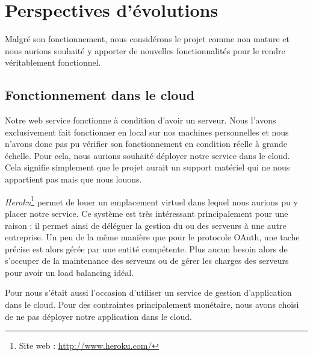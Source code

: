 \section{Perspectives d'évolutions}

Malgré son fonctionnement, nous considérons le projet comme non mature et nous aurions souhaité y apporter de
nouvelles fonctionnalités pour le rendre véritablement fonctionnel.




\subsection{Fonctionnement dans le cloud}

Notre web service fonctionne à condition d'avoir un serveur. Nous l'avons exclusivement fait fonctionner en local
sur nos machines personnelles et nous n'avons donc pas pu vérifier son fonctionnement en condition réelle à grande
échelle. Pour cela, nous aurions souhaité déployer notre service dans le cloud. Cela signifie simplement que le 
projet aurait un support matériel qui ne nous appartient pas mais que nous louons. 

\textit{Heroku}\footnote{Site web : \href{http://www.heroku.com/}{http://www.heroku.com/}} permet de louer un emplacement virtuel 
dans lequel nous aurions pu y placer notre service. Ce système est très intéressant principalement pour une raison : il permet ainsi de déléguer la gestion du ou des serveurs à une autre entreprise. Un peu de la même manière que pour
le protocole OAuth, une tache précise est alors gérée par une entité compétente. Plus aucun besoin alors de s'occuper
de la maintenance des serveurs ou de gérer les charges des serveurs pour avoir un load balancing idéal.

Pour nous s'était aussi l'occasion d'utiliser un service de gestion d'application dans le cloud. Pour des contraintes
principalement monétaire, nous avons choisi de ne pas déployer notre application dans le cloud.




